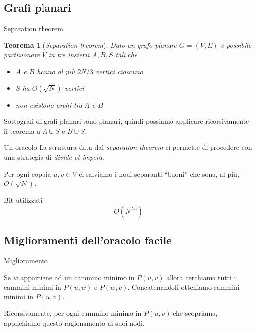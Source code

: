 \documentclass{beamer}
\newcounter{counter1}
\theoremstyle{plain}
\newtheorem{myteo}[counter1]{Teorema}
\theoremstyle{definition}
\theoremstyle{remark}
\newcommand{\pa}[1]{\left(#1\right)}
\begin{document}
\subsection{Grafi planari}

\begin{frame}{Separation theorem}
  \begin{myteo}[\textit{Separation theorem}]
    Dato un grafo planare $G = (V,E)$ \`e possibile partizionare $V$
    in tre insiemi $A,B,S$ tali che
    \begin{itemize}
    \item $A$ e $B$ hanno al pi\`u $2N/3$ vertici ciascuno
    \item $S$ ha $O\pa{ \sqrt{N}}$ vertici
    \item non esistono archi tra $A$ e $B$
    \end{itemize}
  \end{myteo}
  \vfill
  \pause
  Sottografi di grafi planari sono planari, quindi possiamo applicare
  ricorsivamente il teorema a $A\cup S$ e $B\cup S$.
\end{frame}

\begin{frame}{Un oracolo}
  La struttura data dal \textit{separation theorem} ci permette di
  procedere con una strategia di \textit{divide et impera}.
  \vfill \pause

  Per ogni coppia $u,v\in V$ ci salviamo i nodi separanti ``buoni''
  che sono, al pi\`u, $O\pa{\sqrt{N}}$.
  \vfill \pause

  \begin{block}{Bit utilizzati}
    \[ O \pa{N^{2.5}} \]
  \end{block}
\end{frame}

\subsection{Miglioramenti dell'oracolo facile}

\begin{frame}{Miglioramento}
  \begin{block}{}
    Se $w$ appartiene ad un cammino minimo in $P(u,v)$ allora
    cerchiamo tutti i cammini minimi in $P(u,w)$ e
    $P(w,v)$. Concatenandoli otteniamo cammini minimi in $P\pa{u,v}$.
  \end{block}
  \vfill

  Ricorsivamente, per ogni cammino minimo in $P\pa{u,v}$ che
  scopriamo, applichiamo questo ragionamento ai suoi nodi.  
\end{frame}
\end{document}
